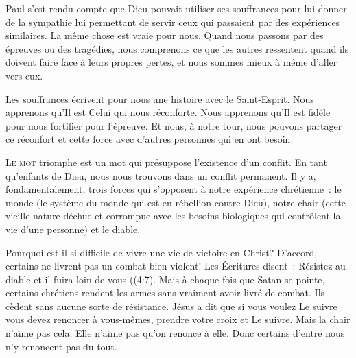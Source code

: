 Paul s'est rendu compte que Dieu pouvait utiliser
 ses souffrances pour lui donner de la sympathie
 lui permettant de servir ceux qui passaient
 par des expériences similaires.
 La même chose est vraie pour nous.
 Quand nous passons par des épreuves ou des tragédies,
 nous comprenons ce que les autres ressentent
 quand ils doivent faire face à leurs propres pertes,
 et nous sommes mieux à même d'aller vers eux.

Les souffrances écrivent pour nous une histoire
 avec le Saint-Esprit.
 Nous apprenons qu'Il est Celui qui nous réconforte.
 Nous apprenons qu'Il est fidèle pour nous fortifier pour l'épreuve.
 Et nous, à notre tour, nous pouvons partager ce réconfort
 et cette force avec d'autres personnes qui en ont besoin.

\dvrule







\lettrine{L}{e mot} \og triomphe \fg{}
 est un mot qui présuppose l'existence d'un conflit.
 En tant qu'enfants de Dieu,
 nous nous trouvons dans un conflit permanent.
 Il y a, fondamentalement, trois forces qui s'opposent
 à notre expérience chrétienne~: le monde
 (le système du monde qui est en rébellion contre Dieu),
 notre chair (cette vieille nature déchue et corrompue
 avec les besoins biologiques qui contrôlent
 la vie d'une personne) et le diable.


Pourquoi est-il si difficile de vivre une vie de victoire en Christ?
 D'accord, certains ne livrent pas un combat bien violent!
 Les Écritures disent~: 
 \og Résistez au diable et il fuira loin de vous \fg{}
 ((4:7).
 Mais à chaque fois que Satan se pointe, certains chrétiens rendent
 les armes sans vraiment avoir livré de combat.
 Ils cèdent sans aucune sorte de résistance.
 Jésus a dit que si vous voulez Le suivre vous devez renoncer à vous-mêmes,
 prendre votre croix et Le suivre.
 Mais la chair n'aime pas cela. Elle n'aime pas qu'on renonce à elle.
 Donc certains d'entre nous n'y renoncent pas du tout.

